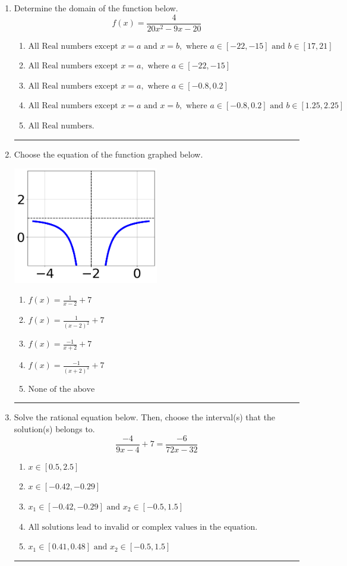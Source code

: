 \documentclass[14pt]{extbook}
\newcommand{\litem}[1]{\item#1\hspace*{-1cm}\rule{\textwidth}{0.4pt}}
\begin{document}
\begin{enumerate}
\litem{
Determine the domain of the function below.\[ f(x) = \frac{4}{20x^{2} -9 x -20} \]\begin{enumerate}[label=\Alph*.]
\item \( \text{All Real numbers except } x = a \text{ and } x = b, \text{ where } a \in [-22, -15] \text{ and } b \in [17, 21] \)
\item \( \text{All Real numbers except } x = a, \text{ where } a \in [-22, -15] \)
\item \( \text{All Real numbers except } x = a, \text{ where } a \in [-0.8, 0.2] \)
\item \( \text{All Real numbers except } x = a \text{ and } x = b, \text{ where } a \in [-0.8, 0.2] \text{ and } b \in [1.25, 2.25] \)
\item \( \text{All Real numbers.} \)

\end{enumerate} }
\litem{
Choose the equation of the function graphed below.
\begin{center}
    \includegraphics[width=0.5\textwidth]{../Figures/rationalGraphToEquationCopyA.png}
\end{center}
\begin{enumerate}[label=\Alph*.]
\item \( f(x) = \frac{1}{x - 2} + 7 \)
\item \( f(x) = \frac{1}{(x - 2)^2} + 7 \)
\item \( f(x) = \frac{-1}{x + 2} + 7 \)
\item \( f(x) = \frac{-1}{(x + 2)^2} + 7 \)
\item \( \text{None of the above} \)

\end{enumerate} }
\litem{
Solve the rational equation below. Then, choose the interval(s) that the solution(s) belongs to.\[ \frac{-4}{9x -4} + 7 = \frac{-6}{72x -32} \]\begin{enumerate}[label=\Alph*.]
\item \( x \in [0.5,2.5] \)
\item \( x \in [-0.42,-0.29] \)
\item \( x_1 \in [-0.42, -0.29] \text{ and } x_2 \in [-0.5,1.5] \)
\item \( \text{All solutions lead to invalid or complex values in the equation.} \)
\item \( x_1 \in [0.41, 0.48] \text{ and } x_2 \in [-0.5,1.5] \)


\end{enumerate}}
\end{enumerate}
\end{document}
